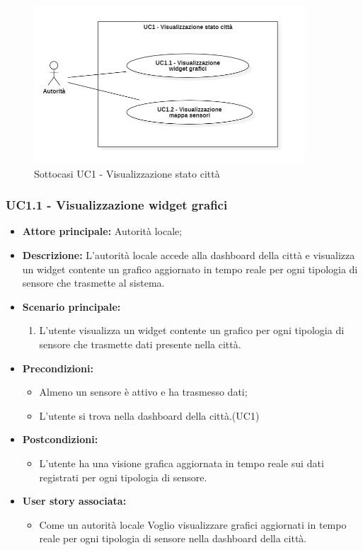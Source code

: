 \documentclass{article}
\begin{document}
\begin{figure}[H]
    \centering
    \includegraphics[width=0.9\textwidth]{Images/uc1_Subcase.PNG} 
    \caption{Sottocasi UC1 - Visualizzazione stato città}
    \label{fig:UC1_sub}
\end{figure}

\subsubsection{UC1.1 - Visualizzazione widget grafici}
\begin{itemize}
    \item \textbf{Attore principale:} Autorità locale;
    \item \textbf{Descrizione:} L'autorità locale accede alla dashboard della città e visualizza un widget contente un grafico aggiornato in tempo reale per ogni tipologia di sensore che trasmette al sistema.
    \item \textbf{Scenario principale:}
          \begin{enumerate}
              \item L'utente visualizza un widget contente un grafico per ogni tipologia di sensore che trasmette dati presente nella città.
          \end{enumerate}
    \item \textbf{Precondizioni:}
          \begin{itemize}
              \item  Almeno un sensore è attivo e ha trasmesso dati;
              \item L'utente si trova nella dashboard della città.(UC1)
          \end{itemize}
    \item \textbf{Postcondizioni:}
          \begin{itemize}
              \item      L'utente ha una visione grafica aggiornata in tempo reale sui dati registrati per ogni tipologia di sensore.
          \end{itemize}
    \item \textbf{User story associata:}
          \begin{itemize}
              \item Come un autorità locale
                    Voglio visualizzare grafici aggiornati in tempo reale per ogni tipologia di sensore nella dashboard della città.
          \end{itemize}

\end{itemize}
\end{document}

